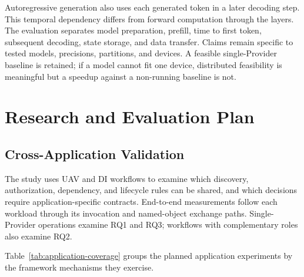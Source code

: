 Autoregressive generation also uses each generated token in a later decoding step. This temporal dependency differs from forward computation through the layers. The evaluation separates model preparation, prefill, time to first token, subsequent decoding, state storage, and data transfer. Claims remain specific to tested models, precisions, partitions, and devices. A feasible single-Provider baseline is retained; if a model cannot fit one device, distributed feasibility is meaningful but a speedup against a non-running baseline is not.



\chapter{Research and Evaluation Plan}
\label{chap:evaluation}
\label{chap:timeline}
\section{Cross-Application Validation}
The study uses UAV and DI workflows to examine which discovery, authorization, dependency, and lifecycle rules can be shared, and which decisions require application-specific contracts. End-to-end measurements follow each workload through its invocation and named-object exchange paths. Single-Provider operations examine RQ1 and RQ3; workflows with complementary roles also examine RQ2.



Table~\ref{tab:application-coverage} groups the planned application experiments by the framework mechanisms they exercise.

